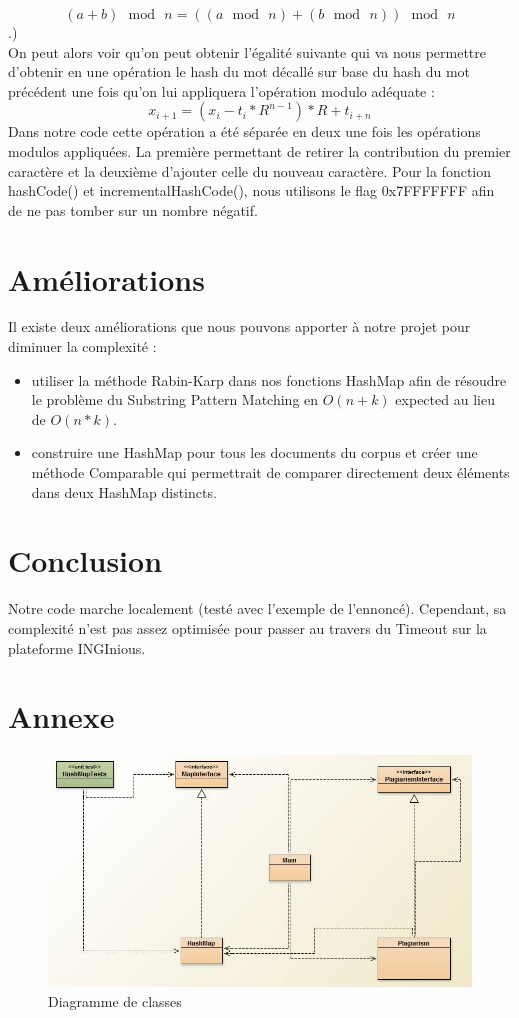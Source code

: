\documentclass[11pt, frenchb]{article}
\begin{document}
$$ (a+b)\,\bmod\,n = ((a\,\bmod\,n)+(b\,\bmod\,n))\,\bmod\,n $$
.)\\ 
On peut alors voir qu'on peut obtenir l'égalité suivante qui va nous permettre d'obtenir en une opération le hash du mot décallé sur base du hash du mot précédent une fois qu'on lui appliquera l'opération modulo adéquate : 
$$ x_{i+1} = (x_i - t_i * R^{n-1}) * R + t_{i+n} $$
Dans notre code cette opération a été séparée en deux une fois les opérations modulos appliquées. La première permettant de retirer la contribution du premier caractère et la deuxième d'ajouter celle du nouveau caractère. Pour la fonction hashCode() et incrementalHashCode(), nous utilisons le flag 0x7FFFFFFF afin de ne pas tomber sur un nombre négatif.
\newpage
\section{Améliorations}
Il existe deux améliorations que nous pouvons apporter à notre projet pour diminuer la complexité :
\begin{itemize}
\item utiliser la méthode Rabin-Karp dans nos fonctions HashMap afin de résoudre le problème du Substring Pattern Matching en $O(n + k)$ expected au lieu de $O(n * k)$.
\item construire une HashMap pour tous les documents du corpus et créer une méthode Comparable qui permettrait de comparer directement deux éléments dans deux HashMap distincts.
\end{itemize}

\section{Conclusion}
Notre code marche localement (testé avec l'exemple de l'ennoncé). Cependant, sa complexité n'est pas assez optimisée pour passer au travers du Timeout sur la plateforme INGInious.

\newpage
\section*{Annexe}
\begin{figure} [!h]
\centering
\includegraphics[scale=0.6]{diag.jpg}
\caption{Diagramme de classes}
\end{figure}
\end{document}
